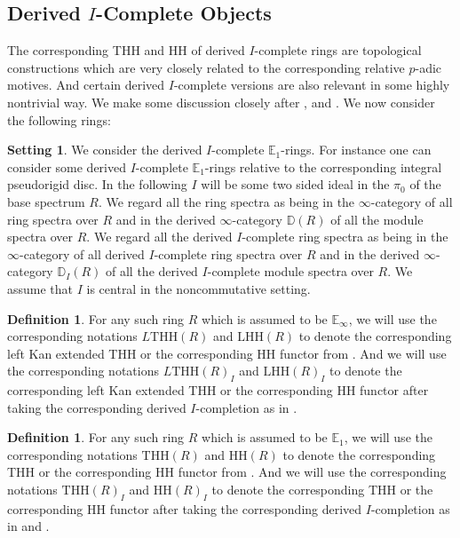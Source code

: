 \documentclass[11pt]{book}
\theoremstyle{definition}
\newtheorem{definition}[theorem]{Definition}
\numberwithin{equation}{section}
\newtheorem{setting}[theorem]{Setting}
\begin{document}
\subsection{Derived $I$-Complete Objects}

\indent The corresponding THH and HH of derived $I$-complete rings are topological constructions which are very closely related to the corresponding relative $p$-adic motives. And certain derived $I$-complete versions are also relevant in some highly nontrivial way. We make some discussion closely after \cite[Section 2.2, Section 2.3]{12BMS}, \cite{12BS} and \cite[Chapter 3]{12NS}. We now consider the following rings:

\begin{setting}
We consider the derived $I$-complete $\mathbb{E}_1$-rings. For instance one can consider some derived $I$-complete $\mathbb{E}_1$-rings relative to the corresponding integral pseudorigid disc. In the following $I$ will be some two sided ideal in the $\pi_0$ of the base spectrum $R$. We regard all the ring spectra as being in the $\infty$-category of all ring spectra over $R$ and in the derived $\infty$-category $\mathbb{D}(R)$ of all the module spectra over $R$. We regard all the derived $I$-complete ring spectra as being in the $\infty$-category of all derived $I$-complete ring spectra over $R$ and in the derived $\infty$-category $\mathbb{D}_I(R)$ of all the derived $I$-complete module spectra over $R$. We assume that $I$ is central in the noncommutative setting. 	
\end{setting}


\begin{definition}
\indent For any such ring $R$ which is assumed to be $\mathbb{E}_\infty$, we will use the corresponding notations $L\mathrm{THH}(R)$ and $\mathrm{LHH}(R)$ to denote the corresponding left Kan extended THH or the corresponding HH functor from \cite[Chapter 3]{12NS}. And we will use the corresponding notations $L\mathrm{THH}(R)_I$ and $\mathrm{LHH}(R)_I$ to denote the corresponding left Kan extended THH or the corresponding HH functor after taking the corresponding derived $I$-completion as in \cite[Chapter 3]{12NS}.	
\end{definition}

\begin{definition}
\indent For any such ring $R$ which is assumed to be $\mathbb{E}_1$, we will use the corresponding notations $\mathrm{THH}(R)$ and $\mathrm{HH}(R)$ to denote the corresponding THH or the corresponding HH functor from \cite[Chapter 3]{12NS}. And we will use the corresponding notations $\mathrm{THH}(R)_I$ and $\mathrm{HH}(R)_I$ to denote the corresponding THH or the corresponding HH functor after taking the corresponding derived $I$-completion as in \cite[Chapter 3]{12NS} and \cite[Chapter 1 Notation]{12BS}.	
\end{definition}
\end{document}
